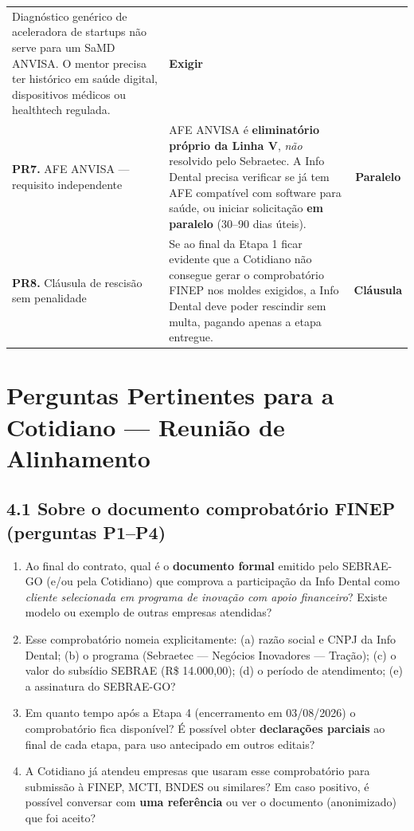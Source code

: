 \documentclass[11pt, a4paper]{article}
\begin{document}
{\begin{xltabular}{\textwidth}{@{} l X c @{}}
    Diagnóstico genérico de aceleradora de startups não serve para um SaMD ANVISA. O mentor precisa ter histórico em saúde digital, dispositivos médicos ou healthtech regulada. &
    \textcolor{accentColor}{\textbf{Exigir}} \\
    \textbf{PR7.} AFE ANVISA --- requisito independente &
    AFE ANVISA é \textbf{eliminatório próprio da Linha V}, \emph{não} resolvido pelo Sebraetec. A Info Dental precisa verificar se já tem AFE compatível com software para saúde, ou iniciar solicitação \textbf{em paralelo} (30--90 dias úteis). &
    \textcolor{warningOrange}{\textbf{Paralelo}} \\
    \textbf{PR8.} Cláusula de rescisão sem penalidade &
    Se ao final da Etapa 1 ficar evidente que a Cotidiano não consegue gerar o comprobatório FINEP nos moldes exigidos, a Info Dental deve poder rescindir sem multa, pagando apenas a etapa entregue. &
    \textcolor{accentColor}{\textbf{Cláusula}} \\
\end{xltabular}
}

\section{Perguntas Pertinentes para a Cotidiano --- Reunião de Alinhamento}

\subsection{4.1 Sobre o documento comprobatório FINEP (perguntas P1--P4)}

\begin{enumerate}[label=\textcolor{primaryColor}{\textbf{P\arabic*.}}, leftmargin=2.2em]
    \item Ao final do contrato, qual é o \textbf{documento formal} emitido pelo SEBRAE-GO (e/ou pela Cotidiano) que comprova a participação da Info Dental como \emph{cliente selecionada em programa de inovação com apoio financeiro}? Existe modelo ou exemplo de outras empresas atendidas?
    \item Esse comprobatório nomeia explicitamente: (a) razão social e CNPJ da Info Dental; (b) o programa (Sebraetec --- Negócios Inovadores --- Tração); (c) o valor do subsídio SEBRAE (R\$ 14.000,00); (d) o período de atendimento; (e) a assinatura do SEBRAE-GO?
    \item Em quanto tempo após a Etapa 4 (encerramento em 03/08/2026) o comprobatório fica disponível? É possível obter \textbf{declarações parciais} ao final de cada etapa, para uso antecipado em outros editais?
    \item A Cotidiano já atendeu empresas que usaram esse comprobatório para submissão à FINEP, MCTI, BNDES ou similares? Em caso positivo, é possível conversar com \textbf{uma referência} ou ver o documento (anonimizado) que foi aceito?
\end{enumerate}
\end{document}

